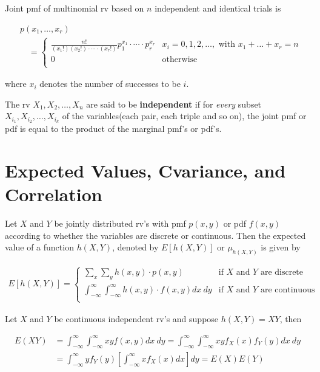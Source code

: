 \begin{proposition}
    Joint pmf of multinomial rv based on $n$ independent and identical trials is 
    
    \begin{align*}
        & p(x_1,\dots,x_r) \\
        & \quad = \left\{\begin{array}{cl}
            \frac{n!}{(x_1!)(x_2!)\cdot\cdots\cdot(x_r!)} p_1^{x_1}\cdot\cdots\cdot p_r^{x_r} & x_i = 0,1,2,\dots, \text{ with }x_1+\dots+x_r = n \\
            0 & \text{otherwise} \\
        \end{array}\right.
    \end{align*}

    where $x_i$ denotes the number of successes to be $i$.
\end{proposition}

\begin{definition}
    The rv $X_1,X_2,\dots,X_n$ are said to be \textbf{independent} if for \textit{every} subset $X_{i_1},X_{i_2},\dots,X_{i_k}$ of the variables(each pair, each triple and so on), the joint pmf or pdf is equal to the product of the marginal pmf's or pdf's.
\end{definition}

\section{Expected Values, Cvariance, and Correlation}

\begin{proposition}
    Let $X$ and $Y$ be jointly distributed rv's with pmf $p(x,y)$ or pdf $f(x,y)$ according to whether the variables are discrete or continuous. Then the expected value of a function $h(X,Y)$, denoted by $E[h(X,Y)]$ or $\mu_{h(X,Y)}$ is given by 

    \begin{align*}
        E[h(X,Y)] = \left\{\begin{array}{cl}
            \sum_x\sum_y h(x,y)\cdot p(x,y) & \text{if }X\text{ and }Y\text{ are discrete} \\
            \int_{-\infty}^\infty \int_{-\infty}^\infty h(x,y)\cdot f(x,y) dx\ dy & \text{if }X\text{ and }Y\text{ are continuous} \\
        \end{array}\right.
    \end{align*}

    Let $X$ and $Y$ be continuous independent rv's and suppose $h(X,Y) = XY$, then 
    
    \begin{align*}
        E(XY) & = \int_{-\infty}^\infty\int_{-\infty}^\infty xyf(x,y)dx\ dy = \int_{-\infty}^\infty\int_{-\infty}^\infty xyf_X(x)f_Y(y) dx\ dy \\
        & = \int_{-\infty}^\infty yf_Y(y)\left[\int_{-\infty}^\infty xf_X(x)dx\right]dy = E(X)E(Y) \\
    \end{align*}
\end{proposition}

